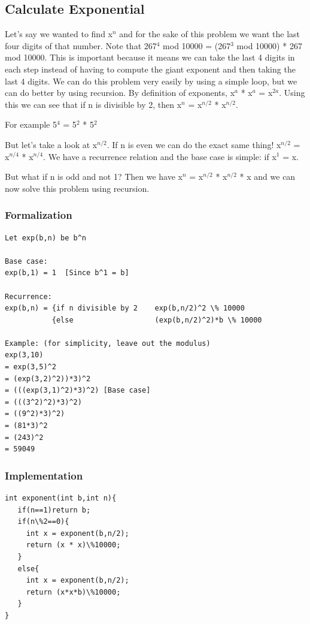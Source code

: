 \documentclass[11pt,oneside]{book}
\begin{document}
\subsection{Calculate Exponential}

Let's say we wanted to find x$^{n}$ and for the sake of this problem we want the last four digits of that number. Note that 267$^{4}$ mod 10000 = (267$^{3}$ mod 10000) * 267 mod 10000. This is important because it means we can take the last 4 digits in each step instead of having to compute the giant exponent and then taking the last 4 digits. We can do this problem very easily by using a simple loop, but we can do better by using recursion. By definition of exponents, x$^{a}$ * x$^{a}$ = x$^{2a}$. Using this we can see that if n is divisible by 2, then x$^{n}$ = x$^{n/2}$ * x$^{n/2}$.

For example 5$^{4}$ = 5$^{2}$ * 5$^{2}$

But let's take a look at x$^{n/2}$. If n is even we can do the exact same thing! x$^{n/2}$ = x$^{n/4}$ * x$^{n/4}$. We have a recurrence relation and the base case is simple: if x$^{1}$ = x.

But what if n is odd and not 1? Then we have x$^{n}$ = x$^{n/2}$ * x$^{n/2}$ * x and we can now solve this problem using recursion.

\subsubsection{Formalization}

\begin{lstlisting}
Let exp(b,n) be b^n

Base case:
exp(b,1) = 1  [Since b^1 = b]

Recurrence:
exp(b,n) = {if n divisible by 2    exp(b,n/2)^2 \% 10000
           {else                   (exp(b,n/2)^2)*b \% 10000

Example: (for simplicity, leave out the modulus)
exp(3,10)
= exp(3,5)^2
= (exp(3,2)^2))*3)^2
= (((exp(3,1)^2)*3)^2) [Base case]
= (((3^2)^2)*3)^2)
= ((9^2)*3)^2)
= (81*3)^2
= (243)^2
= 59049
\end{lstlisting}

\subsubsection{Implementation}

\begin{lstlisting}
int exponent(int b,int n){
   if(n==1)return b;
   if(n\%2==0){
     int x = exponent(b,n/2);
     return (x * x)\%10000;
   }
   else{
     int x = exponent(b,n/2);
     return (x*x*b)\%10000;
   }
}

\end{lstlisting}
\end{document}
